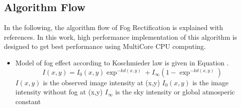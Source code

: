 \subsection{Algorithm Flow}
In the following, the algorithm flow of Fog Rectification is explained with references. In this work, high performance implementation of this algorithm is designed to get best performance using MultiCore CPU computing.
\begin{itemize}
\item Model of fog effect according to Koschmieder law \cite{fog removal} \cite{dehaze} \cite{fastvis} \cite{ChrFramework} is given in Equation .
\begin{equation}\label{fog model}
I(x,y)=I_0(x,y)\exp^{-kd(x,y)} + I_\infty(1-\exp^{-kd(x,y)})
\end{equation}
$I(x,y)$ is the observed image intensity at (x,y)
$I_0(x,y)$ is the image intensity without fog at (x,y)
$I_\infty$ is the sky intensity or global atmosperic constant


\end{itemize}
